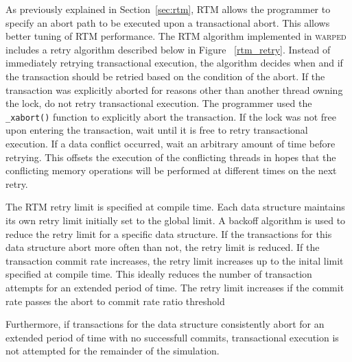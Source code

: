 \documentclass[11pt]{book}
\begin{document}
As previously explained in Section~\ref{sec:rtm}, RTM allows the programmer to
specify an abort path to be executed upon a transactional abort.  This allows
better tuning of RTM performance.  The RTM algorithm implemented in
\textsc{warped} includes a retry algorithm described below in Figure
~\ref{rtm_retry}. Instead of immediately retrying transactional execution, the
algorithm decides when and if the transaction should be retried based on the
condition of the abort.  If the transaction was explicitly aborted for reasons
other than another thread owning the lock, do not retry transactional execution.
The programmer used the \texttt{\_xabort()} function to explicitly abort the
transaction. If the lock was not free upon entering the transaction, wait until
it is free to retry transactional execution.  If a data conflict occurred, wait
an arbitrary amount of time before retrying.  This offsets the execution of the
conflicting threads in hopes that the conflicting memory operations will be
performed at different times on the next retry.

The RTM retry limit is specified at compile time.  Each data structure maintains its own
retry limit initially set to the global limit.  A backoff algorithm is used to reduce the
retry limit for a specific data structure.  If the transactions for this data structure
abort more often than not, the retry limit is reduced.  If the transaction
commit rate increases, the retry limit increases up to the inital limit
specified at compile time.  This ideally reduces the number of transaction
attempts for an extended period of time.  The retry limit increases if the
commit rate passes the abort to commit rate ratio threshold

Furthermore, if transactions for the data structure consistently abort for an extended
period of time with no successfull commits, transactional execution is not attempted for
the remainder of the simulation.
\end{document}
